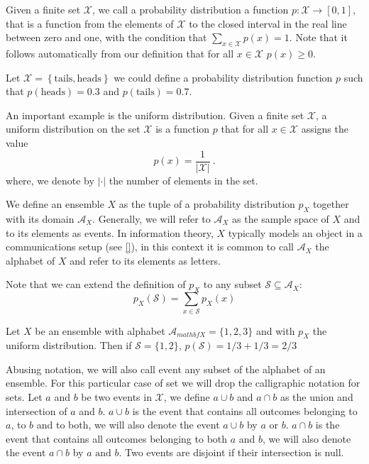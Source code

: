 Given a finite set $\mathcal X$, we call a probability distribution a function $p:\mathcal X\rightarrow[0,1]$, that is a function from the elements of $\mathcal X$ to the closed interval in the real line between zero and one, with the condition that $\sum_{x\in\mathcal X}p(x)=1$. 
Note that it follows automatically from our definition that for all $x\in\mathcal X$ $p(x)\geq 0$. 
\begin{example} Let $\mathcal X =\left\{\text{tails},\text{heads}\right\}$ we could define a probability distribution function $p$ such that $p(\text{heads})=0.3$ and $p(\text{tails})=0.7$.
\end{example}
\begin{example} An important example is the uniform distribution. Given a finite set $\mathcal X$, a uniform distribution on the set $\mathcal X$ is a function $p$ that for all $x\in\mathcal X$ assigns the value $$p(x)=\frac{1}{|\mathcal{X}|}\ .$$ where, we denote by $|\cdot|$ the number of elements in the set.
\end{example}
We define an ensemble $X$ as the tuple of a probability distribution $p_{X}$ together with its domain $\mathcal A_X$. 
Generally, we will refer to $\mathcal A_X$ as the sample space of $X$ and to its elements as events. %
In information theory, $X$ typically models an object in a communications setup (see \ref{}), in this context it is common to call $\mathcal A_X$ the alphabet of $X$ and refer to its elements as letters. %

Note that we can extend the definition of $p_{X}$ to any subset $\mathcal{S}\subseteq \mathcal{A}_X$:
\begin{equation}
p_{X}(\mathcal{S})=\sum_{x\in \mathcal{S}}p_{X}(x)
\end{equation} 
\begin{example}
Let $X$ be an ensemble with alphabet $\mathcal A_{mathbf X}=\{1,2,3\}$ and with $p_{X}$ the uniform distribution. Then if $\mathcal S=\{1,2\}$, $p(\mathcal S)=1/3+1/3=2/3$ 
\end{example}
Abusing notation, we will also call event any subset of the alphabet of an ensemble. For this particular case of set we will drop the calligraphic notation for sets.
Let $a$ and $b$ be two events in $\mathcal{X}$, we define $a\cup b$ and $a\cap b$ as the union and intersection of $a$ and $b$. 
$a\cup b$ is the event that contains all outcomes belonging to $a$, to $b$ and to both, we will also denote the event $a\cup b$ by $a \text{ or } b$. 
$a\cap b$ is the event that contains all outcomes belonging to both $a$ and $b$, we will also denote the event $a\cap b$ by $a \text{ and } b$. Two events are disjoint if their intersection is null.

